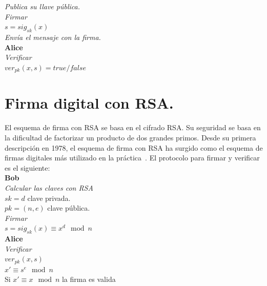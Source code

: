 \textit{Publica su llave pública.} \\
\textit{Firmar} \\

\textit{$ s = sig_{sk} (x) $}\\

\textit{Envía el mensaje con la firma.} \\

\textbf{Alice}\\
\textit{Verificar} \\

\textit{$ ver_{pk} (x,s) = true/false $}  ~\cite{paar}\\ 


\section{Firma digital con RSA. }

El esquema de firma con RSA se basa en el cifrado RSA. Su seguridad se basa en la dificultad de factorizar un producto de dos grandes primos. Desde su primera descripción en 1978, el esquema de firma con RSA ha surgido como el esquema de firmas digitales más utilizado en la práctica~\cite{paar}. El protocolo para firmar y verificar es el siguiente: \\

\textbf{Bob}\\
\textit{Calcular las claves con RSA} \\

\textit{$ sk = d $} clave privada.\\

\textit{$ pk = (n, e) $} clave pública. \\
\textit{Firmar} \\

\textit{$ s = sig_{sk} (x) \equiv x^{d} \mod n $}\\

\textbf{Alice}\\
\textit{Verificar} \\

\textit{$ ver_{pk} (x,s) $}\\ 

\textit{$ x ' \equiv s^{e} \mod n$}\\ 

Si \textit{$ x ' \equiv x \mod n$} la firma es valida\\ 

